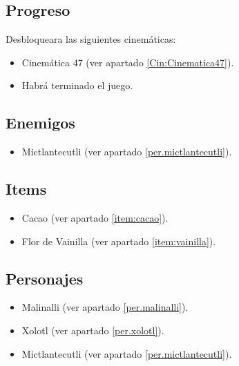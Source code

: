 	\subsection{Progreso}
	Desbloqueara las siguientes cinemáticas:
\begin{itemize}
        \item Cinemática 47 (ver apartado \ref{Cin:Cinematica47}).
        \item Habrá terminado el juego.
\end{itemize}
	\subsection{Enemigos}
	\begin{itemize}
		\item Mictlantecutli (ver apartado \ref{per.mictlantecutli}).
	\end{itemize}
	\subsection{Items}
\begin{itemize}
        \item   Cacao (ver apartado \ref{item:cacao}).
        \item Flor de Vainilla (ver apartado \ref{item:vainilla}).
\end{itemize}
	\subsection{Personajes} 
	\begin{itemize}
		\item Malinalli (ver apartado \ref{per.malinalli}).
		\item Xolotl (ver apartado \ref{per.xolotl}).
		
		\item Mictlantecutli (ver apartado \ref{per.mictlantecutli}).
		
	\end{itemize}

